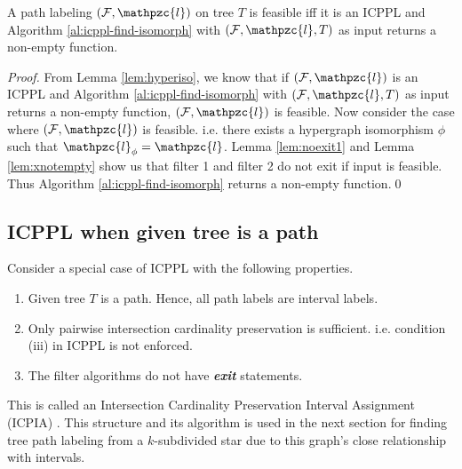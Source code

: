 \documentclass[11pt,letter]{../lib/llncs}
\def\cF{{\cal F}}
\def\cl{\mathpzc{l}}
\def\xnoindent{\noindent} %
\begin{document}
\begin{theorem}
  \label{th:charac}
  A path labeling $(\cF, \cl)$ on tree $T$ is feasible iff it is an
  ICPPL and Algorithm \ref{al:icppl-find-isomorph} with $(\cF, \cl,
  T)$ as input returns a non-empty function.
\end{theorem}
\begin{proof}
  From Lemma \ref{lem:hyperiso}, we know that if $(\cF, \cl)$ is an
  ICPPL and Algorithm \ref{al:icppl-find-isomorph} with $(\cF, \cl,
  T)$ as input returns a non-empty function, $(\cF, \cl)$ is feasible.
  Now consider the case where $(\cF, \cl)$ is feasible. i.e. there
  exists a hypergraph isomorphism $\phi$ such that $\cl_\phi =
  \cl$. Lemma \ref{lem:noexit1} and Lemma \ref{lem:xnotempty} show us
  that filter 1 and filter 2 do not exit if input is feasible. Thus
  Algorithm \ref{al:icppl-find-isomorph} returns a non-empty function.\qed
\end{proof}

\subsection{ICPPL when given tree is a path}
\label{subsec:icpplicpia}
\xnoindent
Consider a special case of ICPPL with the following properties.
\begin{enumerate}
\item Given tree $T$ is a path. Hence, all path labels are interval labels.
\item Only pairwise intersection cardinality
  preservation is sufficient. i.e. condition (iii) in ICPPL is not enforced.
\item The filter algorithms do not have {\em \bf exit} statements.
\end{enumerate}
This is called an Intersection Cardinality Preservation Interval
Assignment (ICPIA) \cite{nsnrs09}. This structure and its algorithm is
used in the next section for finding tree path labeling from a
$k$-subdivided star due to this graph's close relationship with
intervals. 
\end{document}
